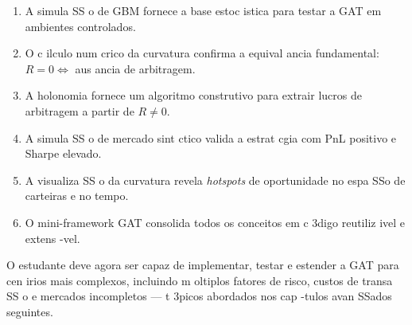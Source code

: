 \begin{enumerate}
 \item A simula SS o de GBM fornece a base estoc istica para testar a GAT em ambientes controlados.
 \item O c ilculo num crico da curvatura confirma a equival ancia fundamental: \(R = 0 \iff\) aus ancia de arbitragem.
 \item A holonomia fornece um algoritmo construtivo para extrair lucros de arbitragem a partir de \(R \neq 0\).
 \item A simula SS o de mercado sint ctico valida a estrat cgia com PnL positivo e Sharpe elevado.
 \item A visualiza SS o da curvatura revela \textit{hotspots} de oportunidade no espa SSo de carteiras e no tempo.
 \item O mini-framework GAT consolida todos os conceitos em c 3digo reutiliz ivel e extens -vel.
\end{enumerate}

O estudante deve agora ser capaz de implementar, testar e estender a GAT para cen irios mais complexos, incluindo m oltiplos fatores de risco, custos de transa SS o e mercados incompletos --- t 3picos abordados nos cap -tulos avan SSados seguintes.


